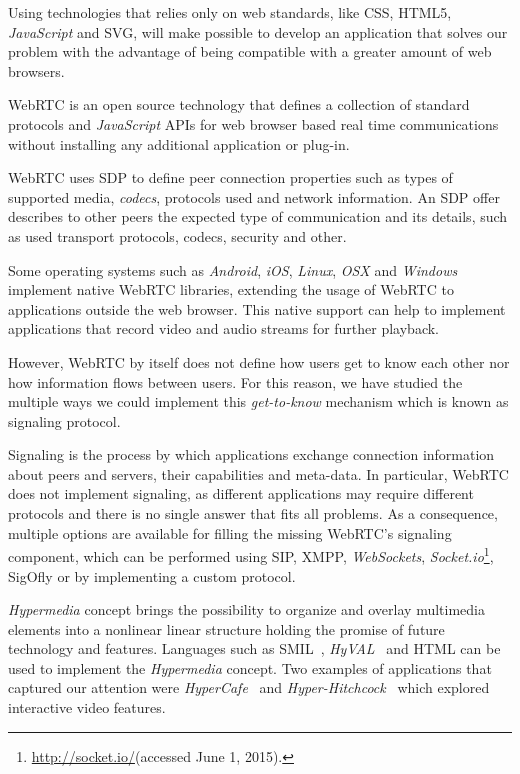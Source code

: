 \documentclass[10pt,conference]{IEEEtran}
\begin{document}
  Using technologies that relies only on web standards, like \gls{CSS}, \gls{HTML}5, \emph{JavaScript} and \gls{SVG}, will make possible to develop an application that solves our problem with the advantage of being compatible with a greater amount of web browsers.








\gls{WebRTC} is an open source technology that defines a collection of standard protocols and \emph{JavaScript} \gls{API}s for web browser based real time communications without installing any additional application or plug-in. 

\gls{WebRTC} uses \gls{SDP} \cite{rfc4566} to define peer connection properties such as types of supported media, \emph{codecs}, protocols used and network information. An \gls{SDP} offer describes to other peers the expected type of communication and its details, such as used transport protocols, codecs, security and other.


Some operating systems such as \emph{Android}, \emph{iOS}, \emph{Linux}, \emph{OSX} and \emph{Windows} implement native \gls{WebRTC} libraries, extending the usage of \gls{WebRTC} to applications outside the web browser. This native support can help to implement applications that record video and audio streams for further playback.

However, \gls{WebRTC} by itself does not define how users get to know each other nor how information flows between users. For this reason, we have studied the multiple ways we could implement this \emph{get-to-know} mechanism which is known as signaling protocol.


  Signaling is the process by which applications exchange connection information about peers and servers, their capabilities and meta-data.
  In particular, \gls{WebRTC} does not implement signaling, as different applications may require different protocols and there is no single answer that fits all problems.
  As a consequence, multiple options are available for filling the missing \gls{WebRTC}'s signaling component, which can be performed using \gls{SIP}\cite{rfc3261}, \gls{XMPP}, \emph{WebSockets}, \emph{Socket.io}\footnote{\url{http://socket.io/}(accessed June 1, 2015).}, \gls{SigOfly}\cite{sigofly} or by implementing a custom protocol.

 
	\emph{Hypermedia} concept brings the possibility to organize and overlay multimedia elements into a nonlinear linear structure holding the promise of future technology and features. Languages such as \gls{SMIL}~\cite{hyval}, \emph{HyVAL}~\cite{hyval} and \gls{HTML} can be used to implement the \emph{Hypermedia} concept. Two examples of applications that captured our attention were \emph{HyperCafe}~\cite{hypercafe} and \emph{Hyper-Hitchcock}~\cite{hitchcock} which explored interactive video features.
\end{document}
